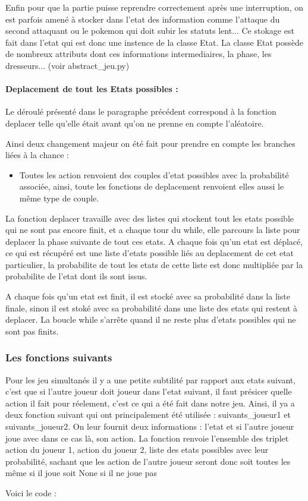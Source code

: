                 Enfin pour que la partie puisse reprendre correctement après une interruption, on est parfois amené à stocker dans l'etat des information comme l'attaque du second attaquant ou le pokemon qui doit subir les statuts lent... Ce stokage est fait dans l'etat qui est donc une instence de la classe Etat. La classe Etat possède de nombreux attributs dont ces informations intermediaires, la phase, les dresseurs... (voir abstract\_jeu.py)
            \smallskip
            \paragraph{Deplacement de tout les Etats possibles :}
                Le déroulé présenté dans le paragraphe précédent correspond à la fonction deplacer telle qu'elle était avant qu'on ne prenne en compte l'aléatoire.
                
                Ainsi deux changement majeur on été fait pour prendre en compte les branches liées à la chance : 
                \begin{itemize}
                    \item Toutes les action renvoient des couples d'etat possibles avec la probabilité associée, ainsi, toute les fonctions de deplacement renvoient elles aussi le même type de couple.
                \end{itemize} La fonction deplacer travaille avec des listes qui stockent tout les etats possible qui ne sont pas encore finit, et a chaque tour du while, elle parcours la liste pour deplacer la phase suivante de tout ces etats.  A chaque fois qu'un etat est déplacé, ce qui est récupéré est une liste d'etats possible liés au deplacement de cet etat particulier, la probabilite de tout les etats de cette liste est donc multipliée par la probabilite de l'etat dont ils sont issus.
                
                A chaque fois qu'un etat est finit, il est stocké avec sa probabilité dans la liste finale, sinon il est stoké avec sa probabilité dans une liste des etats qui restent à deplacer. La boucle while s'arrête quand il ne reste plus d'etats possibles qui ne sont pas finits.
                
        \subsubsection{Les fonctions suivants}
            Pour les jeu simultanés il y a une petite subtilité par rapport aux etats suivant, c'est que si l'autre joueur doit joueur dans l'etat suivant, il faut présicer quelle action il fait pour réelement, c'est ce qui a été fait dans notre jeu. Ainsi, il ya a deux fonction suivant qui ont principalement été utilisée : suivants\_joueur1 et suivants\_joueur2. On leur fournit deux informations : l'etat et si l'autre joueur joue avec dans ce cas là, son action. La fonction renvoie l'ensemble des triplet action du joueur 1, action du joueur 2, liste des etats possibles avec leur probabilité, sachant que les action de l'autre joueur seront donc soit toutes les même si il joue soit None si il ne joue pas
            
            Voici le code :
            
            